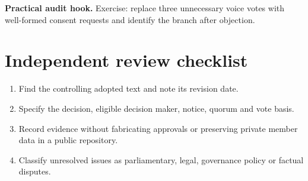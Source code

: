 \documentclass[11pt]{article}
\begin{document}
\textbf{Practical audit hook.} Exercise: replace three unnecessary voice votes with well-formed consent requests and identify the branch after objection.

\section{Independent review checklist}
\begin{enumerate}[leftmargin=*,itemsep=4pt]
\item Find the controlling adopted text and note its revision date.
\item Specify the decision, eligible decision maker, notice, quorum and vote basis.
\item Record evidence without fabricating approvals or preserving private member data in a public repository.
\item Classify unresolved issues as parliamentary, legal, governance policy or factual disputes.
\end{enumerate}
\end{document}
